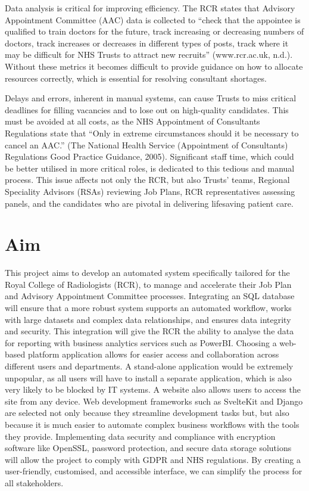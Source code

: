 Data analysis is critical for improving efficiency. The RCR states that Advisory Appointment Committee (AAC) data is collected to “check that the appointee is qualified to train doctors for the future, track increasing or decreasing numbers of doctors, track increases or decreases in different types of posts, track where it may be difficult for NHS Trusts to attract new recruits” (www.rcr.ac.uk, n.d.). Without these metrics it becomes difficult to provide guidance on how to allocate resources correctly, which is essential for resolving consultant shortages.

Delays and errors, inherent in manual systems, can cause Trusts to miss critical deadlines for filling vacancies and to lose out on high-quality candidates. This must be avoided at all costs, as the NHS Appointment of Consultants Regulations state that “Only in extreme circumstances should it be necessary to cancel an AAC.” (The National Health Service (Appointment of Consultants) Regulations Good Practice Guidance, 2005). Significant staff time, which could be better utilised in more critical roles, is dedicated to this tedious and manual process. This issue affects not only the RCR, but also Trusts’ teams, Regional Speciality Advisors (RSAs) reviewing Job Plans, RCR representatives assessing panels, and the candidates who are pivotal in delivering lifesaving patient care.
\section{Aim}
This project aims to develop an automated system specifically tailored for the Royal College of Radiologists (RCR), to manage and accelerate their Job Plan and Advisory Appointment Committee processes. Integrating an SQL database will ensure that a more robust system supports an automated workflow, works with large datasets and complex data relationships, and ensures data integrity and security. This integration will give the RCR the ability to analyse the data for reporting with business analytics services such as PowerBI. Choosing a web-based platform application allows for easier access and collaboration across different users and departments. A stand-alone application would be extremely unpopular, as all users will have to install a separate application, which is also very likely to be blocked by IT systems. A website also allows users to access the site from any device. Web development frameworks such as SvelteKit and Django are selected not only because they streamline development tasks but, but also because it is much easier to automate complex business workflows with the tools they provide. Implementing data security and compliance with encryption software like OpenSSL, password protection, and secure data storage solutions will allow the project to comply with GDPR and NHS regulations. By creating a user-friendly, customised, and accessible interface, we can simplify the process for all stakeholders.